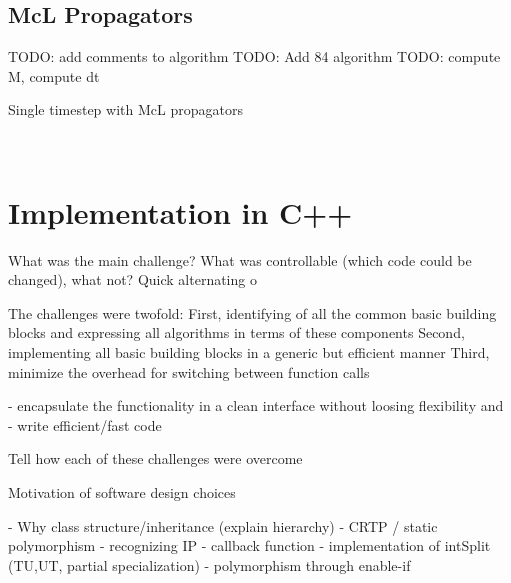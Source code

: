 \subsection{McL Propagators}
\label{sub:mcl_propagator}
%
TODO: add comments to algorithm
TODO: Add 84 algorithm
TODO: compute M, compute dt
\begin{algorithm}[h]
	\caption{Single timestep with McL propagators}
	\label{alg:mcl}
	\begin{algorithmic}
			\State {}
			\State {}
			\State {}
			\State {}
			\State {}
		\EndProcedure
		\\\hrulefill
			\State {}
			\State {}
			\State {}
			\State {}
			\State {}
			\State {}
			\State {}
		\EndProcedure
	\end{algorithmic}
\end{algorithm}


\clearpage
\section{Implementation in C++}

\cite{libwaveblocks}
What was the main challenge? What was controllable (which code could be changed), what not? 
Quick alternating o

The challenges were twofold: 
First, identifying of all the common basic building blocks and expressing all algorithms in terms of these components
Second, implementing all basic building blocks in a generic but efficient manner
Third, minimize the overhead for switching between function calls

 - encapsulate the functionality in a clean interface without loosing flexibility and 
 - write efficient/fast code

Tell how each of these challenges were overcome


Motivation of software design choices

	- Why class structure/inheritance (explain hierarchy)
	- CRTP / static polymorphism \cite{C_CRTP}
	- recognizing IP
	- callback function
	- implementation of intSplit (TU,UT, partial specialization)
	- polymorphism through enable-if




